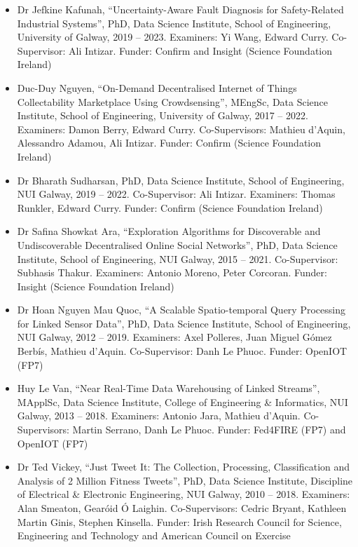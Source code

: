 \documentclass[10pt,a4paper]{res} %
\begin{document}
\begin{resume}
\begin{itemize} \itemsep -2pt
\item Dr Jefkine Kafunah, ``Uncertainty-Aware Fault Diagnosis for Safety-Related Industrial Systems'', PhD, Data Science Institute, School of Engineering, University of Galway, 2019 -- 2023. Examiners: Yi Wang, Edward Curry. Co-Supervisor: Ali Intizar. Funder: Confirm and Insight (Science Foundation Ireland) %
\item Duc-Duy Nguyen, ``On-Demand Decentralised Internet of Things Collectability Marketplace Using Crowdsensing'', MEngSc, Data Science Institute, School of Engineering, University of Galway, 2017 -- 2022. Examiners: Damon Berry, Edward Curry. Co-Supervisors: Mathieu d'Aquin, Alessandro Adamou, Ali Intizar. Funder: Confirm (Science Foundation Ireland)
\item Dr Bharath Sudharsan, PhD, Data Science Institute, School of Engineering, NUI Galway, 2019 -- 2022. Co-Supervisor: Ali Intizar. Examiners: Thomas Runkler, Edward Curry. Funder: Confirm (Science Foundation Ireland) %
\item Dr Safina Showkat Ara, ``Exploration Algorithms for Discoverable and Undiscoverable Decentralised Online Social Networks'', PhD, Data Science Institute, School of Engineering, NUI Galway, 2015 -- 2021. Co-Supervisor: Subhasis Thakur. Examiners: Antonio Moreno, Peter Corcoran. Funder: Insight (Science Foundation Ireland) %
\item Dr Hoan Nguyen Mau Quoc, ``A Scalable Spatio-temporal Query Processing for Linked Sensor Data'', PhD, Data Science Institute, School of Engineering, NUI Galway, 2012 -- 2019. Examiners: Axel Polleres, Juan Miguel G\'{o}mez Berb\'{i}s, Mathieu d'Aquin. Co-Supervisor: Danh Le Phuoc. Funder: OpenIOT (FP7) %
\item Huy Le Van, ``Near Real-Time Data Warehousing of Linked Streams'', MApplSc, Data Science Institute, College of Engineering \& Informatics, NUI Galway, 2013 -- 2018. Examiners: Antonio Jara, Mathieu d'Aquin. Co-Supervisors: Martin Serrano, Danh Le Phuoc. Funder: Fed4FIRE (FP7) and OpenIOT (FP7)
\item Dr Ted Vickey, ``Just Tweet It: The Collection, Processing, Classification and Analysis of 2 Million Fitness Tweets'', PhD, Data Science Institute, Discipline of Electrical \& Electronic Engineering, NUI Galway, 2010 -- 2018. Examiners: Alan Smeaton, Gear\'{o}id \'{O} Laighin. Co-Supervisors: Cedric Bryant, Kathleen Martin Ginis, Stephen Kinsella. Funder: Irish Research Council for Science, Engineering and Technology and American Council on Exercise %

\end{itemize}
\end{resume}
\end{document}
